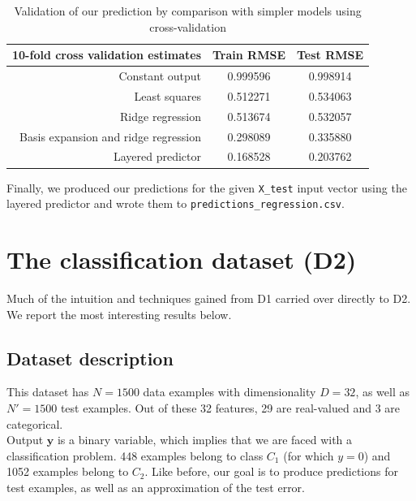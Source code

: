 \documentclass{article} %
\begin{document}
  \begin{table}[ht]
    \center
    \begin{tabular}{|r|c|c|}
      \hline
      \textbf{10-fold cross validation estimates} & Train RMSE & Test RMSE \\
      \hline
      Constant output                             & 0.999596   & 0.998914  \\
      \hline
      Least squares                               & 0.512271   & 0.534063  \\
      \hline
      Ridge regression                            & 0.513674   & 0.532057  \\
      \hline
      Basis expansion and ridge regression        & 0.298089   & 0.335880  \\
      \hline
      Layered predictor                           & 0.168528   & 0.203762  \\
      \hline
    \end{tabular}
    \caption{Validation of our prediction by comparison with simpler models using cross-validation}
    \label{predictor-validation}
  \end{table}

  Finally, we produced our predictions for the given \texttt{X\_test} input vector using the layered predictor and wrote them to \texttt{predictions\_regression.csv}.



\section{The classification dataset (D2)}
  Much of the intuition and techniques gained from D1 carried over directly to D2. We report the most interesting results below.

  \subsection{Dataset description}
  This dataset has $N = 1500$ data examples with dimensionality $D = 32$, as well as $N' = 1500$ test examples. Out of these 32 features, 29 are real-valued and 3 are categorical.\\
  Output $\mathbf{y}$ is a binary variable, which implies that we are faced with a classification problem. 448 examples belong to class $C_1$ (for which $y = 0$) and 1052 examples belong to $C_2$. Like before, our goal is to produce predictions for test examples, as well as an approximation of the test error.
\end{document}
